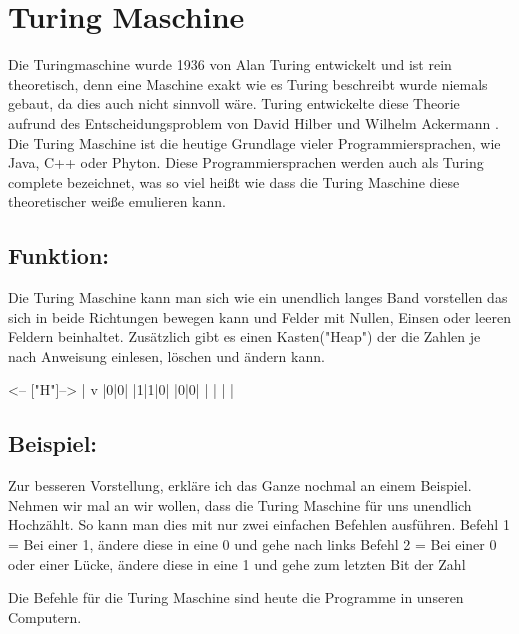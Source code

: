 \section{Turing Maschine}
Die Turingmaschine wurde 1936 von Alan Turing entwickelt und ist rein theoretisch, denn eine Maschine exakt wie es Turing beschreibt wurde niemals gebaut, da dies auch nicht sinnvoll wäre. Turing entwickelte diese Theorie aufrund des Entscheidungsproblem von David Hilber und Wilhelm Ackermann \cite{theessentialturing}. Die Turing Maschine ist die heutige Grundlage vieler Programmiersprachen, wie Java, C++ oder Phyton. Diese Programmiersprachen werden auch als Turing complete bezeichnet, was so viel heißt wie dass die Turing Maschine diese theoretischer weiße emulieren kann.

\subsection{Funktion:} Die Turing Maschine kann man sich wie ein unendlich langes Band vorstellen das sich in beide Richtungen bewegen kann und Felder mit Nullen, Einsen oder leeren Feldern beinhaltet. Zusätzlich gibt es einen Kasten("Heap") der die Zahlen je nach Anweisung einlesen, löschen und ändern kann.

       <-- ["H"]-->
             |
             v
|0|0| |1|1|0| |0|0| | | | |

\subsection{Beispiel:} Zur besseren Vorstellung, erkläre ich das Ganze nochmal an einem Beispiel. Nehmen wir mal an wir wollen, dass die Turing Maschine für uns unendlich Hochzählt. So kann man dies mit nur zwei einfachen Befehlen ausführen. 
Befehl 1 = Bei einer 1, ändere diese in eine 0 und gehe nach links 
Befehl 2 = Bei einer 0 oder einer Lücke, ändere diese in eine 1 und gehe zum letzten Bit der Zahl

Die Befehle für die Turing Maschine sind heute die Programme in unseren Computern.